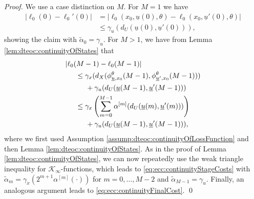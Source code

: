 \documentclass[letterpaper, 10 pt, conference]{IEEEconf}  %
\newcommand{\cKi}{\mathcal{K}_\infty} %
\newcommand{\s}{\phi} %
\newcommand{\is}[1]{{\underline{#1}}} %
\theoremstyle{theorem}
\theoremstyle{definition}
\theoremstyle{remark}
\begin{document}
\begin{proof}
We use a case distinction on $M$. For $M=1$ we have
\begin{align*}
 |\ell_0(0) - \ell_0'(0)| & = |\ell_0(x_0,\is{u}(0),\theta)-\ell_0(x_0,\is{u}'(0),\theta)| \\
 & \leq \gamma_u(d_U(\is{u}(0), \is{u}'(0))),
\end{align*}
showing the claim with $\tilde\alpha_0=\gamma_u$.
For $M>1$, we have from Lemma \ref{lem:dteoc:continuityOfStates} that 
\begin{align*}
    & |\ell_0(M-1)-\ell_0(M-1)| \\
    & \hspace{0.5cm} \leq \gamma_x(d_X(\s_{\is{u},x_0}^\theta(M-1), \s_{\is{u}',x_0}^\theta(M-1))) \\
        & \hspace{1cm} + \gamma_u(d_U(\is{u}(M-1),\is{u}'(M-1))) \\
    & \hspace{0.5cm} \leq \gamma_x\left(\sum_{m=0}^{M-1} \alpha^{[m]}(d_U(\is{u}(m),\is{u}'(m))) \right) \\
        & \hspace{1cm} + \gamma_u(d_U(\is{u}(M-1),\is{u}'(M-1))),
\end{align*}
where we first used Assumption \ref{assump:dteoc:continuityOfLossFunction} and then Lemma \ref{lem:dteoc:continuityOfStates}.
As in the proof of Lemma \ref{lem:dteoc:continuityOfStates}, we can now repeatedly use the weak triangle inequality for $\cKi$-functions,
which leads to \eqref{eq:ecc:continuityStageCosts} with $\tilde\alpha_m=\gamma_x(2^{m+1}\alpha^{[m]}(\cdot))$ for $m=0,\ldots,M-2$ and $\tilde\alpha_{M-1}=\gamma_u$.
Finally, an analogous argument leads to \eqref{eq:ecc:continuityFinalCost}.
\qed
\end{proof}
\end{document}

